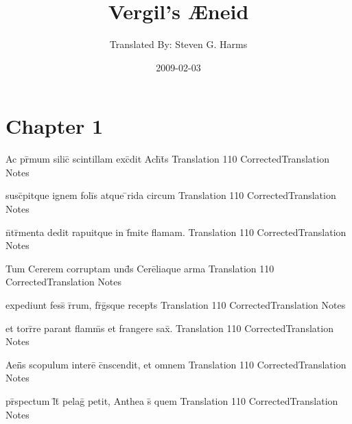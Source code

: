 \documentclass[]{book}
\title{Vergil's {\AE}neid}
\author{ Translated By:  Steven G. Harms }
\date{2009-02-03}
\begin{document}

\ifpdf
{}
\else
{}
\fi

\enumstyle 

\maketitle
\tableofcontents

\chapter{Chapter 1}
%
%
%
%
%



\latline
  {Ac pr\={\macron {\i}}mum silic\={\macron {\i}} scintillam exc\={}dit Ach\={}t\={}s}
  { Translation }
  {110}
  { CorrectedTranslation }
  { Notes }



\latline
  {susc\={}pitque ignem foli\={\macron {\i}}s atque \={}rida circum}
  { Translation }
  {110}
  { CorrectedTranslation }
  { Notes }


\latline
  {n\={}tr\={\macron {\i}}menta dedit rapuitque in f\={}mite flamam.}
  { Translation }
  {110}
  { CorrectedTranslation }
  { Notes }


\latline
  {Tum Cererem corruptam und\={\macron {\i}}s Cere\={}liaque arma}
  { Translation }
  {110}
  { CorrectedTranslation }
  { Notes }



\latline
  {expediunt fess\={\macron {\i}} r\={}rum, fr\={}g\={}sque recept\={}s}
  { Translation }
  {110}
  { CorrectedTranslation }
  { Notes }


\latline
  {et torr\={}re parant flamm\={\macron {\i}}s et frangere sax\={}.}
  { Translation }
  {110}
  { CorrectedTranslation }
  { Notes }


\latline
  {Aen\={}\={}s scopulum intere\={} c\={}nscendit, et omnem}
  { Translation }
  {110}
  { CorrectedTranslation }
  { Notes }



\latline
  {pr\={}spectum l\={}t\={} pelag\={} petit, Anthea s\={\macron {\i}} quem}
  { Translation }
  {110}
  { CorrectedTranslation }
  { Notes }
\end{document}
